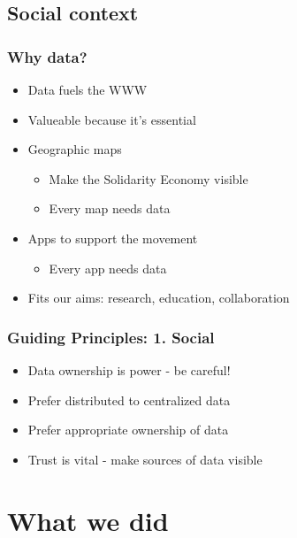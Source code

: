 \subsection{Social context}
\frame
{
  \frametitle{Why data?}
  \begin{itemize}
    \item Data fuels the WWW
    \item Valueable because it's essential
    \item Geographic maps
      \begin{itemize}
	\item Make the Solidarity Economy visible
	\item Every map needs data
      \end{itemize}
    \item Apps to support the movement
      \begin{itemize}
	\item Every app needs data
      \end{itemize}
    \item Fits our aims: research, education, collaboration
  \end{itemize}
}
\frame
{
  \frametitle{Guiding Principles: 1. Social}
  \begin{itemize}
    \item Data ownership is power - be careful!
    \item Prefer distributed to centralized data
    \item Prefer appropriate ownership of data
    \item Trust is vital - make sources of data visible
  \end{itemize}
}
\section{What we did}
